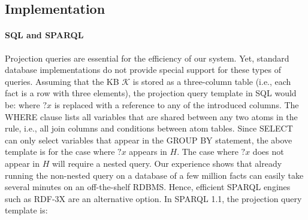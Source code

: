 \subsection{Implementation}
\paragraph{SQL and SPARQL} Projection queries are essential for the efficiency of our system. Yet, standard database implementations do not provide special support for these types of queries. Assuming that the KB $\mathcal{K}$ is stored as a three-column table (i.e., each fact is a row with three elements), the projection query template in SQL would be:
where $?x$ is replaced with a reference to any of the introduced columns. The WHERE clause lists all variables that are shared between any two atoms in the rule, i.e., all join columns and conditions between atom tables. Since SELECT can only select variables that appear in the GROUP BY statement, the above template is for the case where $?x$ appears in $H$. The case where $?x$ does not appear in $H$ will require a nested query.
Our experience shows that already running the non-nested query on a database of a few million facts can easily take several minutes on an off-the-shelf RDBMS. Hence, efficient SPARQL engines such as RDF-3X \cite{rdf3x} are an alternative option. In SPARQL 1.1, the projection query template is: 
